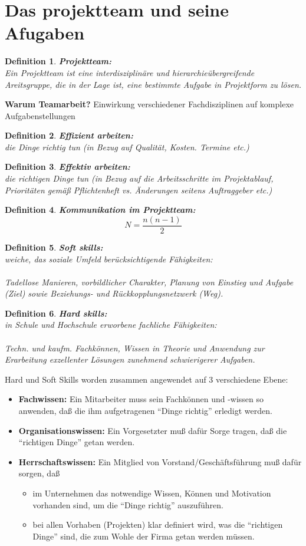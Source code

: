 \documentclass[11pt,a4paper]{article}
\newenvironment{de}[1]
{\begin{mdframed}[style=de]\begin{mydef}{\textbf{#1:}}\\} 
{\end{mydef}\end{mdframed}}
\newtheorem{mydef}{Definition}
\begin{document}
\section{Das projektteam und seine Afugaben}

\begin{de}{Projektteam}
Ein Projektteam ist eine interdisziplinäre und hierarchieübergreifende Areitsgruppe, die in der Lage ist, eine bestimmte Aufgabe in Projektform zu lösen.
\end{de}
\textbf{Warum Teamarbeit?} Einwirkung verschiedener Fachdisziplinen auf komplexe Aufgabenstellungen

\begin{de}{Effizient arbeiten}
die Dinge richtig tun
(in Bezug auf Qualität, Kosten. Termine etc.)
\end{de}

\begin{de}{Effektiv arbeiten}
die richtigen Dinge tun
(in Bezug auf die Arbeitsschritte im Projektablauf,
Prioritäten gemäß Pflichtenheft vs. Änderungen
seitens Auftraggeber etc.)
\end{de}

\begin{de}{Kommunikation im Projektteam}
$$
N = \frac{n(n-1)}{2}
$$
\end{de}

\begin{de}{Soft skills}
weiche, das soziale Umfeld berücksichtigende Fähigkeiten:\\
\\
Tadellose Manieren, vorbildlicher Charakter, Planung von Einstieg und
Aufgabe (Ziel) sowie Beziehungs- und Rückkopplungsnetzwerk (Weg).
\end{de}

\begin{de}{Hard skills}
in Schule und Hochschule erworbene fachliche Fähigkeiten:\\
\\
Techn. und kaufm. Fachkönnen, Wissen in Theorie und Anwendung zur
Erarbeitung exzellenter Lösungen zunehmend schwierigerer Aufgaben.
\end{de}

Hard und Soft Skills worden zusammen angewendet auf 3 verschiedene Ebene:
\begin{itemize}
\item \textbf{Fachwissen:} Ein Mitarbeiter muss sein Fachkönnen und -wissen so
anwenden, daß die ihm aufgetragenen ``Dinge richtig'' erledigt werden.
\item \textbf{Organisationswissen:} Ein Vorgesetzter muß dafür Sorge tragen, daß die
``richtigen Dinge'' getan werden.
\item \textbf{Herrschaftswissen:} Ein Mitglied von Vorstand/Geschäftsführung muß
dafür sorgen, daß
\begin{itemize}
	\item im Unternehmen das notwendige Wissen, Können und Motivation
vorhanden sind, um die ``Dinge richtig'' auszuführen.
	\item bei allen Vorhaben (Projekten) klar definiert wird, was die ``richtigen
Dinge'' sind, die zum Wohle der Firma getan werden müssen.
\end{itemize}
\end{itemize}
\end{document}
